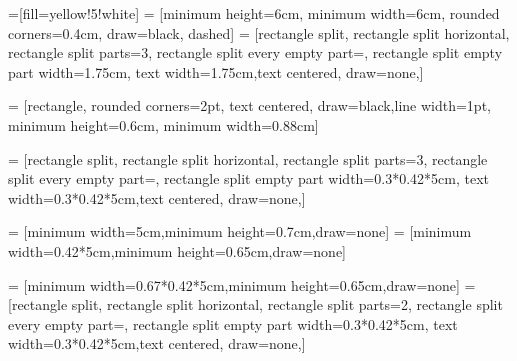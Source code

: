 \def\policywidth{5cm}
\def\shorthorizon{0.42*\policywidth}
\def\heightgap{0.6cm}
\def\figurew{1.95cm}
\def\figureh{1.65cm}
\def\gfigurew{1.95cm}
\def\gfigureh{1.3cm}
\def\figureww{1.5cm}

=[fill=yellow!5!white]
 = [minimum height=6cm, minimum width=6cm, rounded corners=0.4cm, draw=black, dashed]
 = [rectangle split, 
        rectangle split horizontal,
        rectangle split parts=3,
        rectangle split every empty part={},
        rectangle split empty part width=1.75cm,
        text width=1.75cm,text centered,
        draw=none,]
        
 = [rectangle, rounded corners=2pt, text centered, draw=black,line width=1pt, minimum height=0.6cm, minimum width=0.88cm]

 = [rectangle split, 
        rectangle split horizontal,
        rectangle split parts=3,
        rectangle split every empty part={},
        rectangle split empty part width=0.3*\shorthorizon,
        text width=0.3*\shorthorizon,text centered,
        draw=none,]

 = [minimum width=\policywidth,minimum height=0.7cm,draw=none]
 = [minimum width=\shorthorizon,minimum height=0.65cm,draw=none]

 = [minimum width=0.67*\shorthorizon,minimum height=0.65cm,draw=none]
 = [rectangle split, 
        rectangle split horizontal,
        rectangle split parts=2,
        rectangle split every empty part={},
        rectangle split empty part width=0.3*\shorthorizon,
        text width=0.3*\shorthorizon,text centered,
        draw=none,]

